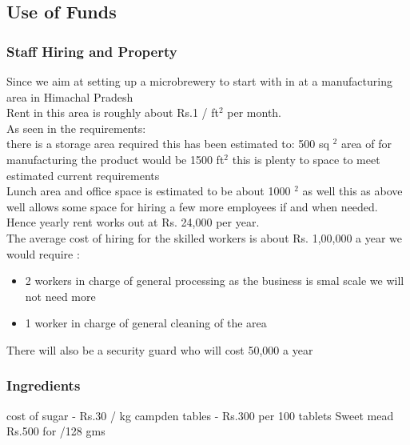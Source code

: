 \documentclass[11pt]{article}
\begin{document}
  \subsection{Use of Funds}
      \subsubsection{Staff Hiring and Property}
Since we aim at setting up a microbrewery to start with in at a manufacturing area in Himachal Pradesh \\
Rent in this area is roughly about Rs.1 / ft$^2$ per month. \\
As seen in the requirements: \\
there is a storage area required this has been estimated to: 500 sq $^2$ area of for manufacturing the product would be 1500 ft$^2$ this is plenty to space to meet estimated current requirements \\
Lunch area and office space is estimated to be about 1000 $^2$ as well this as above well allows some space for hiring a few more employees if and when needed. \\
Hence yearly rent works out at Rs. 24,000 per year. \\
The average cost of hiring for the skilled workers is about Rs. 1,00,000 a year we would require :
\begin{itemize}
    \subsubsection{Staff Hiring and Property}
Since we aim at setting up a microbrewery to start with in at a manufacturing area in Himachal Pradesh

Rent in this area is roughly about Rs.1 / ft$^2$ per month.
As seen in the requirements:

there is a storage area required this has been estimated to: 500 sq $^2$ area of for manufacturing the product would be 1500 ft$^2$ this is plenty to space to meet estimated current requirements

\item 2 workers in charge of general processing as the business is smal scale we will not need more
\item 1 worker in charge of general cleaning of the area
\end{itemize}

There will also be a security guard who will cost 50,000 a year
   \subsubsection{Ingredients}
cost of sugar -  Rs.30 / kg
campden tables  - Rs.300 per 100 tablets
Sweet mead Rs.500 for /128 gms
\end{document}
